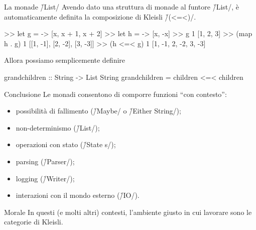 \begin{frame}[fragile]{\secname}{La monade \h/List/}
Avendo dato una struttura di monade al funtore \h/List/, è automaticamente definita la composizione di Kleisli \h/(<=<)/.
\pause

\begin{runhaskell}
>>  let g = \x -> [x, x + 1, x + 2]
>>  let h = \x -> [x, -x]
>>  g 1
    [1, 2, 3]
>>  (map h . g) 1
    [[1, -1], [2, -2], [3, -3]]
>>  (h <=< g) 1
    [1, -1, 2, -2, 3, -3]
\end{runhaskell}
\pause

Allora possiamo semplicemente definire

\begin{haskellcode}
grandchildren :: String -> List String
grandchildren = children <=< children
\end{haskellcode}
\end{frame}

\begin{frame}[fragile]{\secname}{Conclusione}
Le monadi consentono di comporre funzioni ``con contesto'':
\begin{itemize}[<+(1)->]
\item possibilità di fallimento (\h/Maybe/ o \h/Either String/);
\item non-determinismo (\h/List/);
\item operazioni con stato (\h/State s/);
\item parsing (\h/Parser/);
\item logging (\h/Writer/);
\item interazioni con il mondo esterno (\h/IO/).
\end{itemize}
\pause
\begin{block}{Morale}
In questi (e molti altri) contesti, l'ambiente giusto in cui lavorare sono le categorie di Kleisli.
\end{block}
\end{frame}